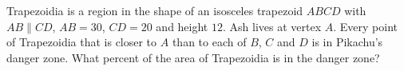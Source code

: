 Trapezoidia is a region in the shape of an isosceles trapezoid $ABCD$ with $AB\parallel CD$, $AB=30$, $CD=20$ and height $12$. Ash lives at vertex $A$. Every point of Trapezoidia that is closer to $A$ than to each of $B$, $C$ and $D$ is in Pikachu's danger zone. What percent of the area of Trapezoidia is in the danger zone?
